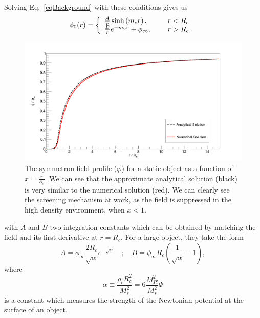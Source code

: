 \documentclass[nofootinbib,twocolumn]{revtex4}
\begin{document}
Solving Eq.~\eqref{eqBackground} with these conditions gives us
\begin{equation}\label{eqphir}
\phi_0(r) = \left\{
\begin{array}{ll}
      \frac{A}{r}\sinh\left(m_cr\right), & \hspace{5mm}r<R_c\\
     \frac{B}{r}e^{-m_0 r}+\phi_{\infty}, & \hspace{5mm}r>R_c \, . \\
\end{array} 
\right. 
\end{equation}
\begin{figure}[t]
    \centering
    \includegraphics[width=1\columnwidth]{Images/Static.png}
    \caption{The symmetron field profile ($\varphi$) for a static object as a function of $x=\frac{r}{R_c}$. We can see that the approximate analytical solution (black) is very similar to the numerical solution (red). We can clearly see the screening mechanism at work, as the field is suppressed in the high density environment, when $x<1$. }
    \label{Static}
\end{figure}
with $A$ and $B$ two integration constants which can be obtained by matching the field and its first derivative at $r=R_c$. For a large object, they take the form \cite{Hinterbichler:2010es}
\begin{equation}
    A = \phi_{\infty}\frac{2R_c}{\sqrt{\alpha}}e^{-\sqrt{\alpha}}
    \quad\mathrm{;}\quad 
    B = \phi_{\infty}R_c\left(\frac{1}{\sqrt{\alpha}}-1\right),
\end{equation}
where 
\begin{equation}
\alpha \equiv \frac{\rho_c R_c^2}{M_s^2} = 6\frac{M_{Pl}^2}{M_s^2}\Phi    
\end{equation} 
is a constant which measures the strength of the Newtonian potential at the surface of an object.
\end{document}

